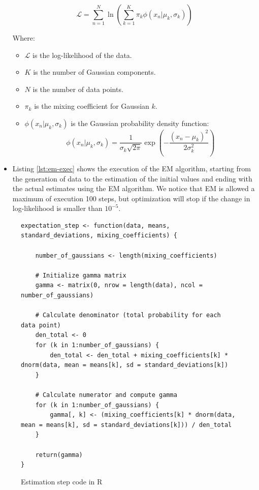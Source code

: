\documentclass[]{article}
\begin{document}
\begin{itemize}
	$$
	\mathcal{L} = \sum_{n=1}^{N} \ln \left( \sum_{k=1}^{K} \pi_k \phi(x_n | \mu_k, \sigma_k) \right)
	$$
	
	Where:
	\begin{itemize}
		\item $\mathcal{L}$ is the log-likelihood of the data.
		\item $K$ is the number of Gaussian components.
		\item $N$ is the number of data points.
		\item $\pi_k$ is the mixing coefficient for Gaussian $k$.
		\item $\phi(x_n | \mu_k, \sigma_k)$ is the Gaussian probability density function:
		$$
		\phi(x_n | \mu_k, \sigma_k) = \frac{1}{\sigma_k \sqrt{2\pi}} \exp \left( -\frac{(x_n - \mu_k)^2}{2\sigma_k^2} \right)
		$$
	\end{itemize}
	
	\item Listing \ref{lst:em-exec} shows the execution of the EM algorithm, starting from the generation of data to the estimation of the initial values and ending with the actual estimates using the EM algorithm. We notice that EM is allowed a maximum of execution 100 steps, but optimization will stop if the change in log-likelihood is smaller than $10^{-5}$.
	
	

\end{itemize}




\begin{figure}[H]
	\captionsetup{type=lstlisting}
	\begin{lstlisting}
expectation_step <- function(data, means, standard_deviations, mixing_coefficients) {
	
	number_of_gaussians <- length(mixing_coefficients)
	
	# Initialize gamma matrix
	gamma <- matrix(0, nrow = length(data), ncol = number_of_gaussians)
	
	# Calculate denominator (total probability for each data point)
	den_total <- 0
	for (k in 1:number_of_gaussians) {
		den_total <- den_total + mixing_coefficients[k] * dnorm(data, mean = means[k], sd = standard_deviations[k])
	}
	
	# Calculate numerator and compute gamma
	for (k in 1:number_of_gaussians) {
		gamma[, k] <- (mixing_coefficients[k] * dnorm(data, mean = means[k], sd = standard_deviations[k])) / den_total
	}
	
	return(gamma)
}			
		\end{lstlisting}
	\caption{Estimation step code in R}
	\label{lst:em-est}
\end{figure}
\end{document}
